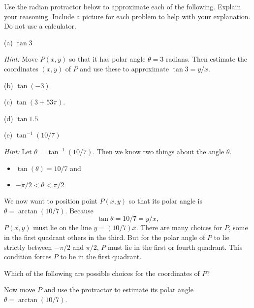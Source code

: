 \documentclass{ximera}
\begin{document}
\begin{question} \label{Q10:InverseTrig}
Use the radian protractor below to approximate each of the following. Explain your reasoning. Include a picture for each problem to help with your explanation. Do not use a calculator.

(a) $\tan 3$

\emph{Hint: } Move $P(x,y)$ so that it has polar angle $\theta =3$ radians. Then estimate the coordinates $(x,y)$ of $P$ and use these to approximate $\tan 3 = y/x$.

(b) $\tan (-3)$

(c) $\tan (3+53\pi)$.

(d) $\tan 1.5$

(e) $\tan^{-1}(10/7)$

\emph{Hint: } Let $\theta = \tan^{-1}(10/7)$. Then we know two things about the angle $\theta$.
\begin{itemize}
\item{$\tan (\theta) = 10/7$ and}

\item{$-\pi/2 < \theta <\pi/2$}

\end{itemize}

We now want to position point $P(x,y)$ so that its polar angle is $\theta = \arctan(10/7)$. Because 
\[
 \tan\theta = 10/7 = y/x ,
\]
$P(x,y)$ must lie on the line $y=(10/7)x$. There are many choices for $P$, some in the first quadrant others in the third. But for 
the polar angle of $P$ to lie strictly between $-\pi/2$ and $\pi/2$, $P$ must lie in the first or fourth quadrant. This condition forces $P$ to be in the first quadrant.


\begin{question}  \label{Q35445fg}
Which of the following are possible choices for the coordinates of $P$?
\begin{multipleChoice}  
\end{multipleChoice}   
\end{question}

Now move $P$ and use the protractor to estimate its polar angle  $\theta = \arctan(10/7)$. 

\begin{exploration}\label{Exp3:Comp}

\end{exploration}
\end{question}
\end{document}

